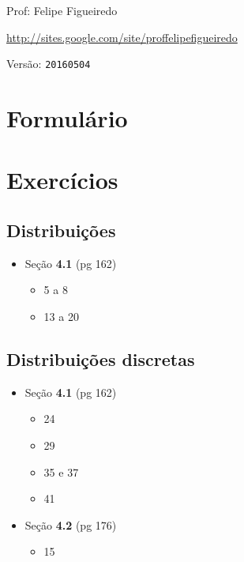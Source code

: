 \documentclass[a4paper]{article}
\begin{document}
\parbox[c]{.825\textwidth}{\raggedright%
{Prof: Felipe Figueiredo\par}
{\url{http://sites.google.com/site/proffelipefigueiredo}\par}
}

Versão: \verb|20160504|



\section{Formulário}

\section{Exercícios}

\subsection{Distribuições}
\begin{itemize}
\item Seção {\bf 4.1} (pg 162)
  \begin{itemize}
\item 5 a 8
\item 13 a 20
  \end{itemize}

\end{itemize}
\subsection{Distribuições discretas}

\begin{itemize}
\item Seção {\bf 4.1} (pg 162)
  \begin{itemize}
  \item 24
  \item 29
  \item 35 e 37
  \item 41
  \end{itemize}
\item Seção {\bf 4.2} (pg 176)
  \begin{itemize}
  \item 15 
  \end{itemize}
\end{itemize}
\end{document}
